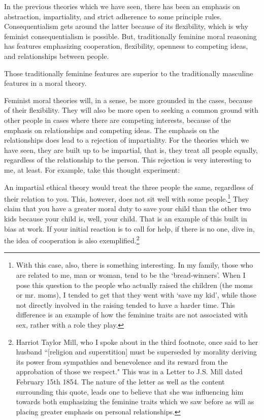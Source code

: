 In the previous theories which we have seen, there has been an emphasis on abstraction, impartiality, and strict adherence to some principle rules. Consequentialism gets around the latter because of its flexibility, which is why feminist consequentialism is possible. But, traditionally feminine moral reasoning has features emphasizing cooperation, flexibility, openness to competing ideas, and relationships between people.
\begin{center}
Those traditionally feminine features are superior to the traditionally masculine features in a moral theory.
\end{center}
Feminist moral theories will, in a sense, be more grounded in the cases, because of their flexibility. They will also be more open to seeking a common ground with other people in cases where there are competing interests, because of the emphasis on relationships and competing ideas. The emphasis on the relationships does lead to a rejection of impartiality. For the theories which we have seen, they are built up to be impartial, that is, they treat all people equally, regardless of the relationship to the person. This rejection is very interesting to me, at least. For example, take this thought experiment:

An impartial ethical theory would treat the three people the same, regardless of their relation to you. This, however, does not sit well with some people.\footnote{With this case, also, there is something interesting. In my family, those who are related to me, man or woman, tend to be the `bread-winners'. When I pose this question to the people who actually raised the children (the moms or mr. moms), I tended to get that they went with `save my kid', while those not directly involved in the raising tended to have a harder time. This difference is an example of how the feminine traits are not associated with sex, rather with a role they play.} They claim that you have a greater moral duty to save your child than the other two kids because your child is, well, your child. That is an example of this built in bias at work. If your initial reaction is to call for help, if there is no one, dive in, the idea of cooperation is also exemplified.\footnote{Harriot Taylor Mill, who I spoke about in the third footnote, once said to her husband ``[religion and superstition] must be superseded
by morality deriving its power from sympathies and benevolence and its reward from the approbation of those we respect."  This was in a Letter to J.S. Mill dated February 15th 1854. The nature of the letter as well as the content surrounding this quote, leads one to believe that she was influencing him towards both emphasizing the feminine traits which we saw before as will as placing greater emphasis on personal relationships.\autocite{Hayek1}}

